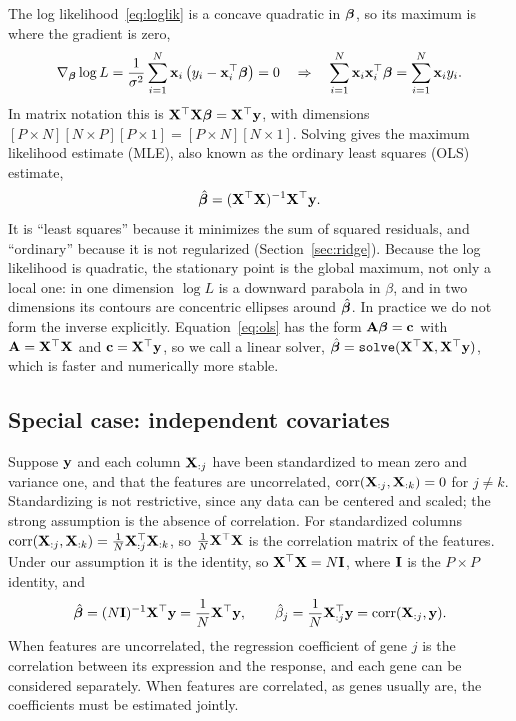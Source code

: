 The log likelihood~\eqref{eq:loglik} is a concave quadratic in $\boldsymbol{\beta}$, so its maximum is where the gradient is zero,
\begin{equation}
  \nabla_{\boldsymbol{\beta}}\log L = \frac{1}{\sigma^2}\sum_{i=1}^N \mathbf{x}_i\left(y_i-\mathbf{x}_i^\top\boldsymbol{\beta}\right) = 0
  \quad\Rightarrow\quad
  \sum_{i=1}^N \mathbf{x}_i\mathbf{x}_i^\top\boldsymbol{\beta} = \sum_{i=1}^N\mathbf{x}_i y_i .
\end{equation}
In matrix notation this is $\mathbf{X}^\top\mathbf{X}\boldsymbol{\beta} = \mathbf{X}^\top\mathbf{y}$, with dimensions $[P\times N][N\times P][P\times 1]=[P\times N][N\times 1]$. Solving gives the maximum likelihood estimate (MLE), also known as the ordinary least squares (OLS) estimate,
\begin{equation}
  \hat{\boldsymbol{\beta}} = (\mathbf{X}^\top\mathbf{X})^{-1}\mathbf{X}^\top\mathbf{y} .
  \label{eq:ols}
\end{equation}
It is ``least squares'' because it minimizes the sum of squared residuals, and ``ordinary'' because it is not regularized (Section~\ref{sec:ridge}). Because the log likelihood is quadratic, the stationary point is the global maximum, not only a local one: in one dimension $\log L$ is a downward parabola in $\beta$, and in two dimensions its contours are concentric ellipses around $\hat{\boldsymbol{\beta}}$.
In practice we do not form the inverse explicitly. Equation~\eqref{eq:ols} has the form $\mathbf{A}\boldsymbol{\beta}=\mathbf{c}$ with $\mathbf{A}=\mathbf{X}^\top\mathbf{X}$ and $\mathbf{c}=\mathbf{X}^\top\mathbf{y}$, so we call a linear solver, $\hat{\boldsymbol{\beta}}=\texttt{solve}(\mathbf{X}^\top\mathbf{X},\mathbf{X}^\top\mathbf{y})$, which is faster and numerically more stable.

\subsection{Special case: independent covariates}

Suppose $\mathbf{y}$ and each column $\mathbf{X}_{:j}$ have been standardized to mean zero and variance one, and that the features are uncorrelated, $\operatorname{corr}(\mathbf{X}_{:j},\mathbf{X}_{:k})=0$ for $j\neq k$. Standardizing is not restrictive, since any data can be centered and scaled; the strong assumption is the absence of correlation. For standardized columns $\operatorname{corr}(\mathbf{X}_{:j},\mathbf{X}_{:k})=\frac{1}{N}\mathbf{X}_{:j}^\top\mathbf{X}_{:k}$, so $\frac{1}{N}\mathbf{X}^\top\mathbf{X}$ is the correlation matrix of the features. Under our assumption it is the identity, so $\mathbf{X}^\top\mathbf{X}=N\mathbf{I}$, where $\mathbf{I}$ is the $P\times P$ identity, and
\begin{equation}
  \hat{\boldsymbol{\beta}} = (N\mathbf{I})^{-1}\mathbf{X}^\top\mathbf{y} = \frac{1}{N}\mathbf{X}^\top\mathbf{y}, \qquad \hat\beta_j = \frac{1}{N}\mathbf{X}_{:j}^\top\mathbf{y} = \operatorname{corr}(\mathbf{X}_{:j},\mathbf{y}).
\end{equation}
When features are uncorrelated, the regression coefficient of gene $j$ is the correlation between its expression and the response, and each gene can be considered separately. When features are correlated, as genes usually are, the coefficients must be estimated jointly.

